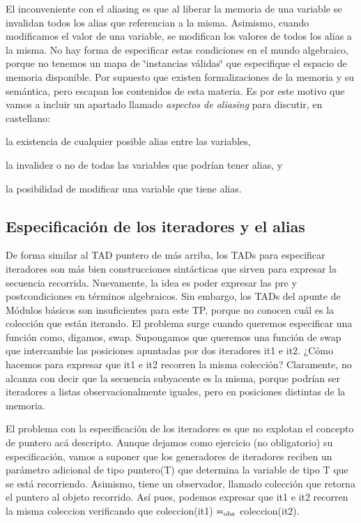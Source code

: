 El inconveniente con el aliasing es que al liberar la memoria de una variable se invalidan todos los alias que referencian a la misma. Asimismo, cuando modificamos el valor de una variable, se modifican los valores de todos los alias a la misma. No hay forma de especificar estas condiciones en el mundo algebraico, porque no tenemos un mapa de \char`\"{}instancias válidas\char`\"{} que especifique el espacio de memoria disponible. Por supuesto que existen formalizaciones de la memoria y su semántica, pero escapan los contenidos de esta materia. Es por este motivo que vamos a incluir un apartado llamado {\itshape aspectos de aliasing} para discutir, en castellano\+:
\begin{DoxyItemize}
\item la existencia de cualquier posible alias entre las variables,
\item la invalidez o no de todas las variables que podrían tener alias, y
\item la posibilidad de modificar una variable que tiene alias.
\end{DoxyItemize}\hypertarget{Aliasing_sec-iteradores}{}\subsection{Especificación de los iteradores y el alias}\label{Aliasing_sec-iteradores}
De forma similar al T\+AD puntero de más arriba, los T\+A\+Ds para especificar iteradores son más bien construcciones sintácticas que sirven para expresar la secuencia recorrida. Nuevamente, la idea es poder expresar las pre y postcondiciones en términos algebraicos. Sin embargo, los T\+A\+Ds del apunte de Módulos básicos son insuficientes para este TP, porque no conocen cuál es la colección que están iterando. El problema surge cuando queremos especificar una función como, digamos, swap. Supongamos que queremos una función de swap que intercambie las posiciones apuntadas por dos iteradores {\ttfamily it1} e {\ttfamily it2}. ¿\+Cómo hacemos para expresar que {\ttfamily it1} e {\ttfamily it2} recorren la misma colección? Claramente, no alcanza con decir que la secuencia subyacente es la misma, porque podrían ser iteradores a listas observacionalmente iguales, pero en posiciones distintas de la memoria.

El problema con la especificación de los iteradores es que no explotan el concepto de puntero acá descripto. Aunque dejamos como ejercicio (no obligatorio) su especificación, vamos a suponer que los generadores de iteradores reciben un parámetro adicional de tipo puntero(\+T) que determina la variable de tipo T que se está recorriendo. Asimismo, tiene un observador, llamado colección que retorna el puntero al objeto recorrido. Así pues, podemos expresar que {\ttfamily it1} e {\ttfamily it2} recorren la misma coleccion verificando que coleccion({\ttfamily it1}) $=_{\rm obs}$ coleccion({\ttfamily it2}). 